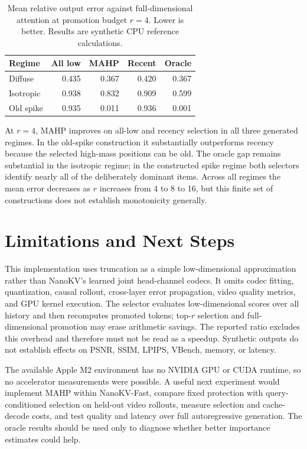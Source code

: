 \documentclass[11pt]{article}
\begin{document}
\begin{table}[t]
\centering
\small
\begin{tabular}{lrrrr}
\toprule
Regime & All low & MAHP & Recent & Oracle \\
\midrule
Diffuse & 0.435 & 0.367 & 0.420 & 0.367 \\
Isotropic & 0.938 & 0.832 & 0.909 & 0.599 \\
Old spike & 0.935 & 0.011 & 0.936 & 0.001 \\
\bottomrule
\end{tabular}
\caption{Mean relative output error against full-dimensional attention at promotion budget $r=4$. Lower is better. Results are synthetic CPU reference calculations.}
\end{table}

At $r=4$, MAHP improves on all-low and recency selection in all three generated regimes. In the old-spike construction it substantially outperforms recency because the selected high-mass positions can be old. The oracle gap remains substantial in the isotropic regime; in the constructed spike regime both selectors identify nearly all of the deliberately dominant items. Across all regimes the mean error decreases as $r$ increases from 4 to 8 to 16, but this finite set of constructions does not establish monotonicity generally.

\section{Limitations and Next Steps}
This implementation uses truncation as a simple low-dimensional approximation rather than NanoKV's learned joint head-channel codecs. It omits codec fitting, quantization, causal rollout, cross-layer error propagation, video quality metrics, and GPU kernel execution. The selector evaluates low-dimensional scores over all history and then recomputes promoted tokens; top-$r$ selection and full-dimensional promotion may erase arithmetic savings. The reported ratio excludes this overhead and therefore must not be read as a speedup. Synthetic outputs do not establish effects on PSNR, SSIM, LPIPS, VBench, memory, or latency.

The available Apple M2 environment has no NVIDIA GPU or CUDA runtime, so no accelerator measurements were possible. A useful next experiment would implement MAHP within NanoKV-Fast, compare fixed protection with query-conditioned selection on held-out video rollouts, measure selection and cache-decode costs, and test quality and latency over full autoregressive generation. The oracle results should be used only to diagnose whether better importance estimates could help.
\end{document}
